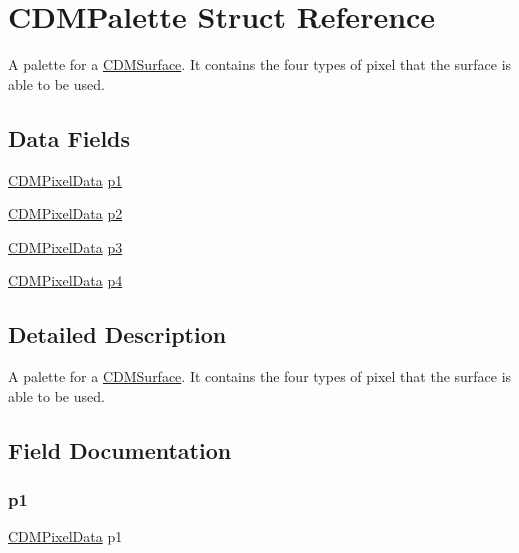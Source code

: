 \hypertarget{struct_c_d_m_palette}{}\section{C\+D\+M\+Palette Struct Reference}
\label{struct_c_d_m_palette}


A palette for a \mbox{\hyperlink{struct_c_d_m_surface}{C\+D\+M\+Surface}}. It contains the four types of pixel that the surface is able to be used.  


\subsection*{Data Fields}
\begin{DoxyCompactItemize}
\item 
\mbox{\hyperlink{struct_c_d_m_pixel_data}{C\+D\+M\+Pixel\+Data}} \mbox{\hyperlink{struct_c_d_m_palette_a4c6a2fedfe750c80560e5d5feefeda3e}{p1}}
\item 
\mbox{\hyperlink{struct_c_d_m_pixel_data}{C\+D\+M\+Pixel\+Data}} \mbox{\hyperlink{struct_c_d_m_palette_ad828960ecdb97b6e8114d18a582aa11a}{p2}}
\item 
\mbox{\hyperlink{struct_c_d_m_pixel_data}{C\+D\+M\+Pixel\+Data}} \mbox{\hyperlink{struct_c_d_m_palette_aa5ac82bfe8c92455fff7acade0e2c9e2}{p3}}
\item 
\mbox{\hyperlink{struct_c_d_m_pixel_data}{C\+D\+M\+Pixel\+Data}} \mbox{\hyperlink{struct_c_d_m_palette_a620eb7d7a1ee6208029f4e024fb297f8}{p4}}
\end{DoxyCompactItemize}


\subsection{Detailed Description}
A palette for a \mbox{\hyperlink{struct_c_d_m_surface}{C\+D\+M\+Surface}}. It contains the four types of pixel that the surface is able to be used. 

\subsection{Field Documentation}
\mbox{\label{struct_c_d_m_palette_a4c6a2fedfe750c80560e5d5feefeda3e}} 
\subsubsection{\texorpdfstring{p1}{p1}}
{\footnotesize\ttfamily \mbox{\hyperlink{struct_c_d_m_pixel_data}{C\+D\+M\+Pixel\+Data}} p1}

